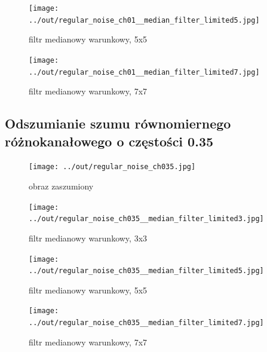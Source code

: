\documentclass[a4paper,12pt]{article}
\begin{document}
\begin{figure}[h!]
\begin{minipage}[t]{7.5cm}
\begin{center}
\texttt{[image: ../out/regular\_noise\_ch01\_\_median\_filter\_limited5.jpg]}
\caption{filtr medianowy warunkowy, 5x5}
\end{center}
\end{minipage}
\hfill
\begin{minipage}[t]{7.5cm}
\begin{center}
\texttt{[image: ../out/regular\_noise\_ch01\_\_median\_filter\_limited7.jpg]}
\caption{filtr medianowy warunkowy, 7x7}
\end{center}
\end{minipage}
\end{figure}


\newpage
\subsection{Odszumianie szumu równomiernego różnokanałowego o częstości 0.35}
\begin{figure}[h!]
\begin{minipage}[t]{7.5cm}
\begin{center}
\texttt{[image: ../out/regular\_noise\_ch035.jpg]}
\caption{obraz zaszumiony}
\end{center}
\end{minipage}
\hfill
\begin{minipage}[t]{7.5cm}
\begin{center}
\texttt{[image: ../out/regular\_noise\_ch035\_\_median\_filter\_limited3.jpg]}
\caption{filtr medianowy warunkowy, 3x3}
\end{center}
\end{minipage}
\end{figure}

\begin{figure}[h!]
\begin{minipage}[t]{7.5cm}
\begin{center}
\texttt{[image: ../out/regular\_noise\_ch035\_\_median\_filter\_limited5.jpg]}
\caption{filtr medianowy warunkowy, 5x5}
\end{center}
\end{minipage}
\hfill
\begin{minipage}[t]{7.5cm}
\begin{center}
\texttt{[image: ../out/regular\_noise\_ch035\_\_median\_filter\_limited7.jpg]}
\caption{filtr medianowy warunkowy, 7x7}
\end{center}
\end{minipage}
\end{figure}
\end{document}
